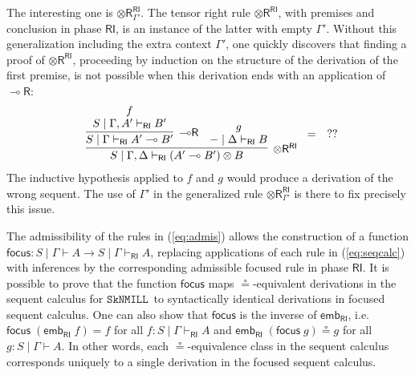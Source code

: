 \documentclass[copyright,creativecommons]{eptcs}
\theoremstyle{definition}
\newcommand{\tr}{\otimes \mathsf{R}}
\newcommand{\lright}{{\multimap}\mathsf{R}}
\newcommand{\ot}{\otimes}
\newcommand{\lolli}{\multimap}
\newcommand{\RI}{\mathsf{RI}}
\newcommand{\proofbox}[1]{\begin{tabular}{l} #1 \end{tabular}}
\newcommand{\SkNMILL}{$\mathtt{SkNMILL}$}
\begin{document}
The interesting one is $\tr_{\Gamma'}^{\RI}$. The tensor right rule $\tr^\RI$, with premises and conclusion in phase $\RI$, is an instance of the latter with empty $\Gamma'$.
Without this generalization including the extra context $\Gamma'$, one quickly discovers that finding a proof of $\tr^\RI$, proceeding by induction on the structure of the derivation of the first premise, is not possible when this derivation ends with an application of $\lright$:
\vspace{-.3cm}
\begin{displaymath}
  \proofbox{
    \infer[\tr^{\RI}]{S \mid \Gamma , \Delta \vdash_{\RI} (A' \lolli B') \ot B}{
    \infer[\lright]{S \mid \Gamma \vdash_{\RI} A' \lolli B'}{
      \deduce{S \mid \Gamma , A' \vdash_{\RI} B'}{f}
    }
    &
    \deduce{{-} \mid \Delta \vdash_{\RI} B}{g}
    }
    } = \quad ??
\end{displaymath}
The inductive hypothesis applied to $f$ and $g$ would produce a derivation of the wrong sequent. The use of $\Gamma'$ in the generalized rule $\tr_{\Gamma'}^{\RI}$ is there to fix precisely this issue.

The admissibility of the rules in (\ref{eq:admis}) allows the construction of a function $\mathsf{focus} : S \mid \Gamma \vdash A \to S \mid \Gamma \vdash_\RI A$, replacing applications of each rule in (\ref{eq:seqcalc}) with inferences by the corresponding admissible focused rule in phase $\RI$.
It is possible to prove that the function $\mathsf{focus}$ maps  $\circeq$-equivalent derivations in the sequent calculus for \SkNMILL\ to syntactically identical derivations in focused sequent calculus. One can also show that $\mathsf{focus}$ is the inverse of $\mathsf{emb}_\RI$, i.e. $\mathsf{focus}\;(\mathsf{emb}_\RI \;f) = f$ for all $f : S \mid \Gamma \vdash_\RI A$ and $\mathsf{emb}_\RI\;(\mathsf{focus}\;g) \circeq g$ for all $g : S \mid \Gamma \vdash A$. In other words, each $\circeq$-equivalence class in the sequent calculus corresponds uniquely to a single derivation in the focused sequent calculus.
\end{document}
